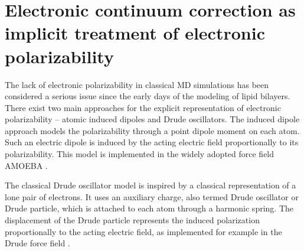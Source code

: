 \section{Electronic continuum correction as implicit treatment of electronic polarizability}
\label{section:ecc}

The lack of electronic polarizability in classical MD simulations
has been considered a serious issue since the early days of the modeling of lipid bilayers. 
There exist two main approaches for the explicit representation of electronic polarizability -- atomic induced dipoles and Drude oscillators.
The induced dipole approach models the polarizability through a point dipole moment on each atom.
Such an electric dipole is induced by the acting electric field proportionally to its polarizability. 
This model is implemented in the widely adopted force field AMOEBA \citep{amoeba06, amoeba10, amoeba13}.

The classical Drude oscillator model is inspired by a classical representation of a lone pair of electrons. 
It uses an auxiliary charge,
also termed Drude oscillator or Drude particle, 
which is attached to each atom through a harmonic spring.
The displacement of the Drude particle represents the induced polarization proportionally to the acting electric field,
as implemented for example in the Drude force field \citep{lemkul2016empirical}. 

